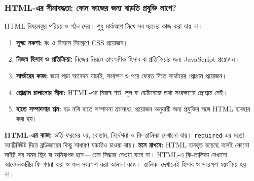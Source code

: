 \subsubsection{HTML-এর সীমাবদ্ধতা: কোন কাজের জন্য বাড়তি প্রযুক্তি লাগে?}
HTML বিষয়বস্তুর পরিচয় ও গঠন দেয়। শুধু মার্কআপ লিখে সব ধরনের কাজ করা যায় না।
\begin{enumerate}
\item \textbf{সূক্ষ্ম নকশা:} রং ও বিন্যাস নিয়ন্ত্রণে CSS প্রয়োজন।
\item \textbf{নিজস্ব হিসাব ও প্রতিক্রিয়া:} নিজের নিয়মে তাৎক্ষণিক হিসাব বা প্রতিক্রিয়ার জন্য JavaScript প্রয়োজন।
\item \textbf{সার্ভারের কাজ:} জমা পড়া আবেদন যাচাই, সংরক্ষণ ও পরে ফেরত দিতে সার্ভারের প্রোগ্রাম প্রয়োজন।
\item \textbf{প্রোগ্রাম চালানোর সীমা:} HTML-এর নিজস্ব শর্ত, লুপ বা ডেটাবেজে তথ্য সংরক্ষণের প্রোগ্রাম নেই।
\item \textbf{হাতে সম্পাদনার শ্রম:} বড় নথি হাতে সম্পাদনা শ্রমসাধ্য; প্রয়োজন অনুযায়ী অন্য প্রযুক্তির সঙ্গে HTML ব্যবহার করা হয়।
\end{enumerate}
\textbf{HTML-এর কাজ:} ভর্তি-ফরমের ঘর, বোতাম, নির্দেশনা ও ফি-তালিকা দেখানো যায়। \texttt{required}-এর মতো অ্যাট্রিবিউট দিয়ে ব্রাউজারের কিছু সাধারণ যাচাইও চাওয়া যায়।
\textbf{মনে রাখবে:} HTML ব্যবহৃত হয়েছে বলেই কোনো সাইট সব সময় স্থির বা অনিরাপদ হবে—এমন সিদ্ধান্ত নেওয়া যাবে না। HTML-এ ফি-তালিকা দেখানো, আবেদনকারীর ফি গণনা করা ও ফল সংরক্ষণ করা আলাদা কাজ। তালিকা দেখালেই হিসাব ও সংরক্ষণ স্বয়ংক্রিয় হয় না।
